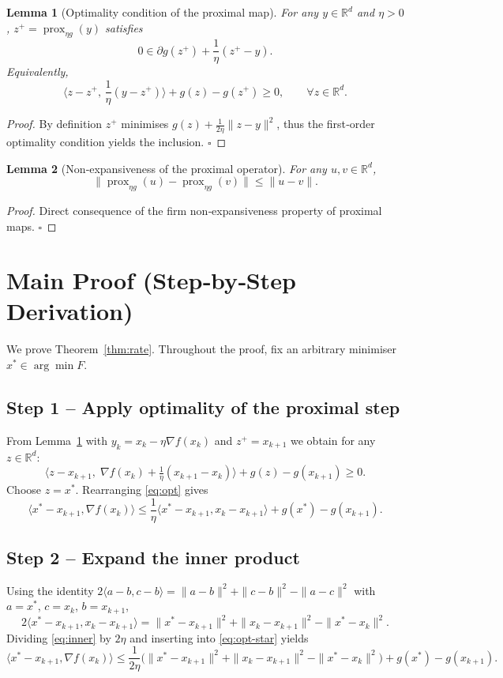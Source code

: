 \documentclass{article}
\newtheorem{lemma}{Lemma}
\newcommand{\prox}{\operatorname{prox}}
\newcommand{\R}{\mathbb{R}}
\begin{document}
\begin{lemma}[Optimality condition of the proximal map]\label{lem:prox-opt}
For any $y\in\R^{d}$ and $\eta>0$, $z^{+}=\prox_{\eta g}(y)$ satisfies
\[
0\in \partial g(z^{+})+\frac{1}{\eta}(z^{+}-y).
\]
Equivalently,
\[
\langle z-z^{+},\,\frac{1}{\eta}(y-z^{+})\rangle + g(z)-g(z^{+})\ge 0,\qquad\forall z\in\R^{d}.
\]
\end{lemma}
\begin{proof}
By definition $z^{+}$ minimises $g(z)+\frac{1}{2\eta}\|z-y\|^{2}$, thus the first‑order optimality condition yields the inclusion. \hfill $\square$
\end{proof}

\begin{lemma}[Non‑expansiveness of the proximal operator]\label{lem:nonexp}
For any $u,v\in\R^{d}$,
\[
\|\prox_{\eta g}(u)-\prox_{\eta g}(v)\|\le\|u-v\|.
\]
\end{lemma}
\begin{proof}
Direct consequence of the firm non‑expansiveness property of proximal maps. \hfill $\square$
\end{proof}

\newpage

\section*{Main Proof (Step‑by‑Step Derivation)}
We prove Theorem~\ref{thm:rate}. Throughout the proof, fix an arbitrary minimiser $x^{*}\in\arg\min F$.

\subsection*{Step 1 – Apply optimality of the proximal step}
From Lemma~\ref{lem:prox-opt} with $y_{k}=x_{k}-\eta\nabla f(x_{k})$ and $z^{+}=x_{k+1}$ we obtain for any $z\in\R^{d}$:
\[
\langle z-x_{k+1},\; \nabla f(x_{k}) +\tfrac{1}{\eta}(x_{k+1}-x_{k})\rangle + g(z)-g(x_{k+1})\ge 0.
\tag{1}
\label{eq:opt}
\]
Choose $z=x^{*}$. Rearranging \eqref{eq:opt} gives
\[
\langle x^{*}-x_{k+1},\nabla f(x_{k})\rangle
\le \frac{1}{\eta}\langle x^{*}-x_{k+1},x_{k}-x_{k+1}\rangle + g(x^{*})-g(x_{k+1}).
\tag{2}
\label{eq:opt-star}
\]

\subsection*{Step 2 – Expand the inner product}
Using the identity $2\langle a-b,c-b\rangle = \|a-b\|^{2}+\|c-b\|^{2}-\|a-c\|^{2}$ with $a=x^{*}$, $c=x_{k}$, $b=x_{k+1}$,
\[
2\langle x^{*}-x_{k+1},x_{k}-x_{k+1}\rangle
= \|x^{*}-x_{k+1}\|^{2}+\|x_{k}-x_{k+1}\|^{2}-\|x^{*}-x_{k}\|^{2}.
\tag{3}
\label{eq:inner}
\]
Dividing \eqref{eq:inner} by $2\eta$ and inserting into \eqref{eq:opt-star} yields
\[
\langle x^{*}-x_{k+1},\nabla f(x_{k})\rangle
\le \frac{1}{2\eta}\bigl(\|x^{*}-x_{k+1}\|^{2}+\|x_{k}-x_{k+1}\|^{2}-\|x^{*}-x_{k}\|^{2}\bigr)
+ g(x^{*})-g(x_{k+1}).
\tag{4}
\label{eq:opt-expanded}
\]
\end{document}
